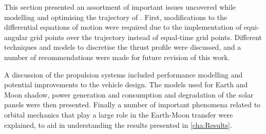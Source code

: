 This section presented an assortment of important issues uncovered while modelling and optimising the trajectory of \BW. First, modifications to the differential equations of motion were required due to the implementation of equi-angular grid points over the trajectory instead of equal-time grid points. Different techniques and models to discretise the thrust profile were discussed, and a number of recommendations were made for future revision of this work. 

A discussion of the propulsion systems included performance modelling and potential improvements to the vehicle design. The models used for Earth and Moon shadow, power generation and consumption and degradation of the solar panels were then presented. Finally a number of important phenomena related to orbital mechanics that play a large role in the Earth-Moon transfer were explained, to aid in understanding the results presented in \autoref{cha:Results}.